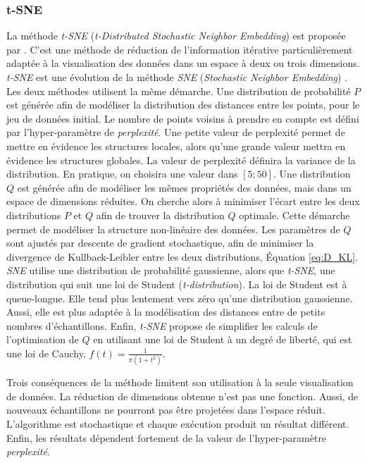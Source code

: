 \subsubsection{t-SNE} \label{subsubsec:tsne}
La méthode \textit{t-SNE} (\textit{t-Distributed Stochastic Neighbor Embedding}) est proposée par \cite{maaten_visualizing_2008}. C'est une méthode de réduction de l'information itérative particulièrement adaptée à la visualisation des données dans un espace à deux ou trois dimensions.
\textit{t-SNE} est une évolution de la méthode \textit{SNE} (\textit{Stochastic Neighbor Embedding}) \cite{hinton_stochastic_2003}.
Les deux méthodes utilisent la même démarche.
Une distribution de probabilité $P$ est générée afin de modéliser la distribution des distances entre les points, pour le jeu de données initial.
Le nombre de points voisins à prendre en compte est défini par l'hyper-paramètre de \textit{perplexité}.
Une petite valeur de perplexité permet de mettre en évidence les structures locales, alors qu'une grande valeur mettra en évidence les structures globales.
La valeur de perplexité définira la variance de la distribution.
En pratique, on choisira une valeur dans $[5; 50]$.
Une distribution $Q$ est générée afin de modéliser les mêmes propriétés des données, mais dans un espace de dimensions réduites.
On cherche alors à minimiser l'écart entre les deux distributions $P$ et $Q$ afin de trouver la distribution $Q$ optimale.
Cette démarche permet de modéliser la structure non-linéaire des données.
Les paramètres de $Q$ sont ajustés par descente de gradient stochastique, afin de minimiser la divergence de Kullback-Leibler entre les deux distributions, Équation \ref{eq:D_KL}.
\textit{SNE} utilise une distribution de probabilité gaussienne, alors que \textit{t-SNE}, une distribution qui suit une loi de Student (\textit{t-distribution}).
La loi de Student est à queue-longue.
Elle tend plus lentement vers zéro qu'une distribution gaussienne.
Aussi, elle est plus adaptée à la modélisation des distances entre de petits nombres d'échantillons.
Enfin, \textit{t-SNE} propose de simplifier les calculs de l'optimisation de $Q$ en utilisant une loi de Student à un degré de liberté, qui est une loi de Cauchy, $f(t)=\frac{1}{\pi(1+t^2)}$.

Trois conséquences de la méthode limitent son utilisation à la seule visualisation de données.
La réduction de dimensions obtenue n'est pas une fonction.
Aussi, de nouveaux échantillons ne pourront pas être projetées dans l'espace réduit.
L'algorithme est stochastique et chaque exécution produit un résultat différent.
Enfin, les résultats dépendent fortement de la valeur de l'hyper-paramètre \textit{perplexité}.

